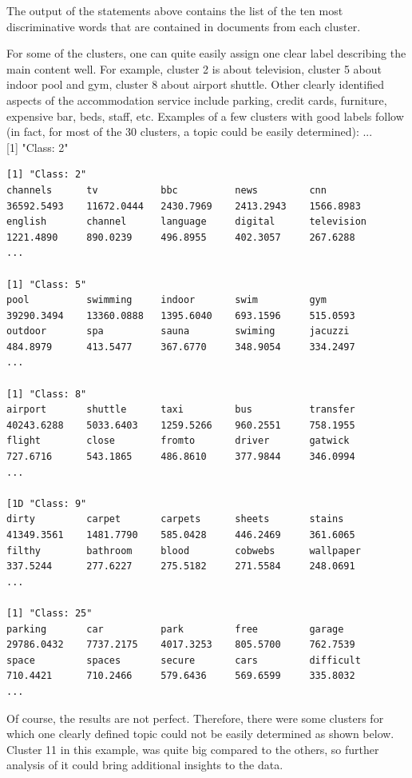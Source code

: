The output of the statements above contains the list of the ten most discriminative words that are contained in documents from each cluster.

For some of the clusters, one can quite easily assign one clear label describing the main content well. For example, cluster 2 is about television, cluster 5 about indoor pool and gym, cluster 8 about airport shuttle. Other clearly identified aspects of the accommodation service include parking, credit cards, furniture,
expensive bar, beds, staff, etc. Examples of a few clusters with good labels follow (in fact, for most of the 30 clusters, a topic could be easily determined):
...\\[0pt]
[1] "Class: 2"


\begin{lstlisting}
[1] "Class: 2"
channels      tv           bbc          news         cnn
36592.5493    11672.0444   2430.7969    2413.2943    1566.8983
english       channel      language     digital      television
1221.4890     890.0239     496.8955     402.3057     267.6288
...

[1] "Class: 5"
pool          swimming     indoor       swim         gym
39290.3494    13360.0888   1395.6040    693.1596     515.0593
outdoor       spa          sauna        swiming      jacuzzi
484.8979      413.5477     367.6770     348.9054     334.2497
...

[1] "Class: 8"
airport       shuttle      taxi         bus          transfer
40243.6288    5033.6403    1259.5266    960.2551     758.1955
flight        close        fromto       driver       gatwick
727.6716      543.1865     486.8610     377.9844     346.0994
...

[1D "Class: 9"
dirty         carpet       carpets      sheets       stains
41349.3561    1481.7790    585.0428     446.2469     361.6065
filthy        bathroom     blood        cobwebs      wallpaper
337.5244      277.6227     275.5182     271.5584     248.0691
...

[1] "Class: 25"
parking       car          park         free         garage
29786.0432    7737.2175    4017.3253    805.5700     762.7539
space         spaces       secure       cars         difficult
710.4421      710.2466     579.6436     569.6599     335.8032
...
\end{lstlisting}



Of course, the results are not perfect. Therefore, there were some clusters for which one clearly defined topic could not be easily determined as shown below. Cluster 11 in this example, was quite big compared to the others, so further analysis of it could bring additional insights to the data.

